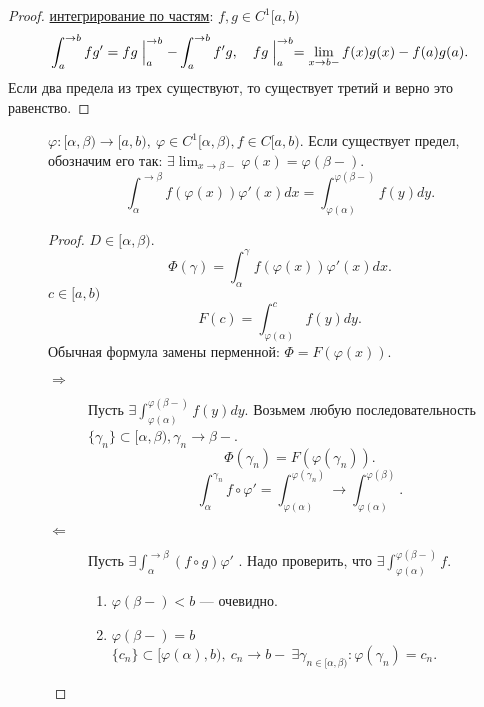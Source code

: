 \begin{prop}
\begin{proof}
	\underline{интегрирование по частям}: 
	$ f, g \in  C^{1}[a, b)$
	\[
	    \int_{a}^{ \to b} f g' = fg \Bigm|_a^{ \to  b} - \int_{a}^{ \to b}  f' g, \quad fg \Bigm|_a^{ \to b} = \lim_{x \to b-} f(x) g(x) - f(a)g(a)
	.\]
	Если два предела из трех существуют, то существует третий и верно это равенство.
    \end{proof}
    \begin{description}
\item []
    $ \varphi : [ \alpha , \beta ) \to [a, b) , ~ \varphi  \in C^{1}[ \alpha , \beta ), f \in C[a, b)$. Если существует предел, обозначим его так: $ \exists \lim_{x \to  \beta -}  \varphi (x) = \varphi ( \beta -)$.
    \[
	\int_{ \alpha }^{ \to \beta } f( \varphi (x)) \varphi '(x) dx = \int_{ \varphi ( \alpha ) }^{ \varphi (\beta -)} f(y) dy
    .\]
    \begin{proof}
	$ D \in [ \alpha , \beta )$. \[
	    \Phi (\gamma) = \int_{ \alpha}^{\gamma}  f( \varphi (x)) \varphi '(x) dx
	.\]
	$ c \in  [a, b)$
	\[
	    F(c) =\int_{ \varphi (\alpha)}^{c } f(y) dy
	.\]
	Обычная формула замены перменной: $ \Phi = F( \varphi (x))$.
	\begin{description}
	    \item [$\boxed{ \Longrightarrow }$]  Пусть $ \exists  \int_{ \varphi ( \alpha )}^{ \varphi (\beta-)}  f(y) dy$. Возьмем любую последовательность $ \{ \gamma_n \} \subset [ \alpha , \beta ),  \gamma _n \to  \beta  -$.
		\[
		    \Phi(\gamma_n) = F( \varphi (\gamma_n))
		.\]
		\[
		    \int_{ \alpha }^{ \gamma_n} f \circ \varphi ' = \int_{ \varphi ( \alpha )}^{ \varphi (\gamma_n)} \to \int_{\varphi(\alpha)}^{\varphi(\beta)}
		.\]
	    \item [$\boxed{ \Longleftarrow }$]  Пусть $ \exists \int_{\alpha}^{ \to \beta }(f \circ g) \varphi '  $
		. Надо проверить, что $ \exists  \int_{ \varphi ( \alpha )}^{ \varphi (\beta -)} f $.
		\begin{enumerate}
		    \item $ \varphi (\beta-) < b$ --- очевидно.
		    \item $ \varphi (\beta -) = b$
			$ \{ c_n \} \subset [ \varphi ( \alpha ), b) ,  ~ c_n \to  b- ~ \exists \gamma_{n \in[ \alpha , \beta )}: \varphi ( \gamma_n) = c_n$.


\end{enumerate}
\end{description}
\end{proof}
\end{description}
\end{prop}
